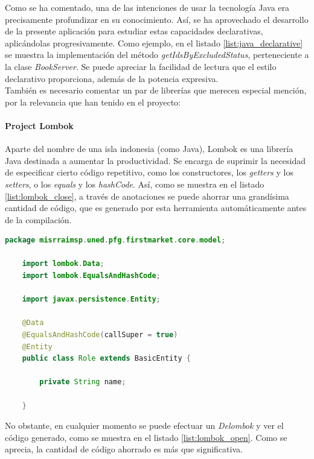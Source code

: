 \documentclass[a4paper]{article}
\begin{document}
    Como se ha comentado, una de las intenciones de usar la tecnología Java era precisamente profundizar en su conocimiento. Así, se ha aprovechado el desarrollo de la presente aplicación para estudiar estas capacidades declarativas, aplicándolas progresivamente. Como ejemplo, en el listado \ref{list:java_declarative} se muestra la implementación del método \emph{getIdsByExcludedStatus}, perteneciente a la clase \emph{BookServer}. Se puede apreciar la facilidad de lectura que el estilo declarativo proporciona, además de la potencia expresiva. 
    \\
    
    También es necesario comentar un par de librerías que merecen especial mención, por la relevancia que han tenido en el proyecto:
    
    \paragraph{Project Lombok}
    Aparte del nombre de una isla indonesia (como Java), Lombok es una librería Java destinada a aumentar la productividad. Se encarga de suprimir la necesidad de especificar cierto código repetitivo, como los constructores, los \emph{getters} y los \emph{setters}, o los \emph{equals} y los \emph{hashCode}. Así, como se muestra en el listado \ref{list:lombok_close}, a través de anotaciones se puede ahorrar una grandísima cantidad de código, que es generado por esta herramienta automáticamente antes de la compilación.
    \\
    
    \begin{lstlisting}[language=Java,caption=Clase \emph{Role} usando las anotaciones Lombok,label=list:lombok_close]
    package misrraimsp.uned.pfg.firstmarket.core.model;
    
    import lombok.Data;
    import lombok.EqualsAndHashCode;
    
    import javax.persistence.Entity;
    
    @Data
    @EqualsAndHashCode(callSuper = true)
    @Entity
    public class Role extends BasicEntity {
    
    	private String name;
    
    }
    \end{lstlisting}
    
    No obstante, en cualquier momento se puede efectuar un \emph{Delombok} y ver el código generado, como se muestra en el listado \ref{list:lombok_open}. Como se aprecia, la cantidad de código ahorrado es más que significativa.
    \\
    
\end{document}
